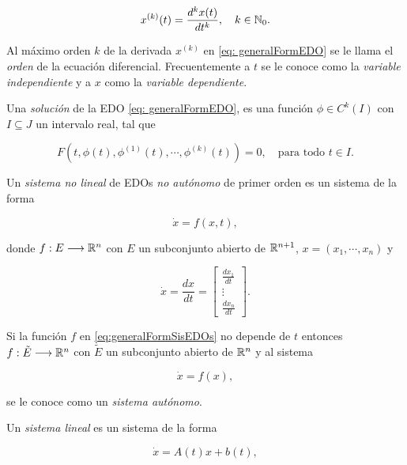 \begin{equation*}
	x^{(k)}(t) = \frac{d^{k}x(t)}{dt^{k}}, \quad k \in {\mathbb{N}}_{0}.
\end{equation*}

Al máximo orden $k$ de la derivada $x^{(k)}$ en \eqref{eq: generalFormEDO} se le llama el \textit{orden} de la ecuación diferencial. Frecuentemente a $t$ se le conoce como la \textit{variable independiente} y a $x$ como la \textit{variable dependiente}.

Una \textit{solución} de la EDO \eqref{eq: generalFormEDO}, es una función $\phi \in C^{k}(I)$ con $I \subseteq J$ un intervalo real, tal que

\begin{equation}
	F(t, \phi(t), \phi^{(1)}(t), \cdots, \phi^{(k)}(t)) = 0, \quad \text{para todo } t \in I.
\end{equation}

Un \textit{sistema no lineal} de EDOs \textit{no autónomo} de primer orden es un sistema de la forma

\begin{equation}
	\dot{x} = f(x, t),
	\label{eq:generalFormSisEDOs}
\end{equation}

donde $f:E \longrightarrow {\mathbb{R}}^{n}$ con $E$ un subconjunto abierto de ${\mathbb{R}}^{n+1}$, $x = (x_{1}, \cdots, x_{n})$ y

\begin{equation*}
	\dot{x} = \frac{dx}{dt} = 
	\begin{bmatrix}
		\frac{dx_{1}}{dt} \\
		\vdots \\
		\frac{dx_{n}}{dt}
	\end{bmatrix}.
\end{equation*}

Si la función $f$ en \eqref{eq:generalFormSisEDOs} no depende de $t$ entonces $f:\tilde{E} \longrightarrow {\mathbb{R}}^{n}$ con $\tilde{E}$ un subconjunto abierto de ${\mathbb{R}}^{n}$ y al sistema 

\begin{equation}
	\dot{x} = f(x),
	\label{eq: sisAut}
\end{equation} 

se le conoce como un \textit{sistema autónomo}.

Un \textit{sistema lineal} es un sistema de la forma

\begin{equation}
	\dot{x} = A(t)x + b(t),
	\label{eq: sistemaLineal}
\end{equation}

